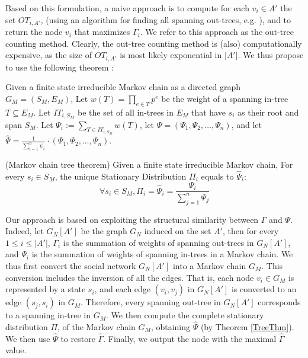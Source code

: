 \documentclass[sigconf,anonymous]{aamas}
\begin{document}
Based on this formulation, a naive approach is to compute for each $v_i\in A'$ the set $OT_{i,A'}$, (using an algorithm for finding all spanning out-trees, e.g. \cite{gabow1978finding}), and to return the node $v_i$ that maximizes $\Gamma_i$. We refer to this approach as the out-tree counting method.
Clearly, the out-tree counting method is (also) computationally expensive, as the size of $OT_{i,A'}$ is most likely exponential in $|A'|$. 
We thus propose to use the following theorem 
\cite{leighton1986estimating}:

Given a finite state irreducible Markov chain as a directed graph $G_M=(S_M,E_M)$, 
Let $w(T) = \prod_{e\in T} p^e$ be the weight of a spanning in-tree $T \subseteq E_M$. Let $IT_{i,S_M}$ be the set of all in-trees in $E_M$ that have $s_i$ as their root and span $S_M$. Let $\Psi_i:= \sum _{T\in IT_{i,S_M}}w(T)$, let $\Psi = (\Psi_1, \Psi_2, \ldots, \Psi_n)$, and let $\hat{\Psi} =\frac{1}{\sum_{i=1}^{n}\psi_i}\cdot (\Psi_1, \Psi_2, \ldots, \Psi_n)$.

\begin{theorem} \label{TreeThm}
(Markov chain tree theorem)
Given a finite state irreducible Markov chain, For every $s_i\in S_M$, the unique Stationary Distribution $\Pi_i$ equals to $\hat{\Psi}_i$:
\begin{equation}
\forall s_i\in S_M,  \Pi_i = \hat{\Psi}_i = \frac{\Psi_i}{\sum _{j=1}^n\Psi_j}    
\end{equation}
\end{theorem}

Our approach is based on exploiting the structural similarity between $\Gamma$ and $\Psi$. Indeed, let $G_N[A']$ be the graph $G_N$ induced on the set $A'$, then for every $1\leq i\leq |A'|$, $\Gamma_i$ is the summation of weights of spanning out-trees in $G_N[A']$,
and $\Psi_i$ is the summation of weights of spanning in-trees in a Markov chain.
We thus first convert the social network $G_N[A']$ %
into a Markov chain $G_M$. %
This conversion includes the inversion of all the edges. That is, each node $v_i\in G_M$ is represented by a state $s_i$,
and each edge $(v_i,v_j)$ in $G_N[A']$ is converted to an edge $(s_j,s_i)$ in $G_M$. 
Therefore, every spanning out-tree in $G_N[A']$ corresponds to a spanning in-tree in $G_M$. We then compute the complete stationary distribution $\Pi$, of the Markov chain $G_M$, obtaining $\hat{\Psi}$
(by Theorem \ref{TreeThm}).
We then use $\hat{\Psi}$ to restore $\hat{\Gamma}$. Finally, we output the node with the maximal $\hat{\Gamma}$ value. %
\end{document}
